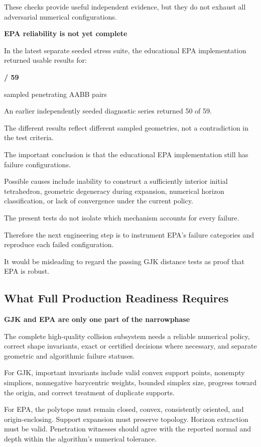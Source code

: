 These checks provide useful independent evidence, but they do not exhaust all adversarial numerical configurations.

\textbf{EPA reliability is not yet complete}

In the latest separate seeded stress suite, the educational EPA implementation returned usable results for:

\textbf{/ 59}

sampled penetrating AABB pairs

An earlier independently seeded diagnostic series returned 50 of 59.

The different results reflect different sampled geometries, not a contradiction in the test criteria.

The important conclusion is that the educational EPA implementation still has failure configurations.

Possible causes include inability to construct a sufficiently interior initial tetrahedron, geometric degeneracy during expansion, numerical horizon classification, or lack of convergence under the current policy.

The present tests do not isolate which mechanism accounts for every failure.

Therefore the next engineering step is to instrument EPA's failure categories and reproduce each failed configuration.

It would be misleading to regard the passing GJK distance tests as proof that EPA is robust.

\subsection{What Full Production Readiness Requires}\label{04-visual-computing-ii-ch026-what-full-production-readiness-requires}

\textbf{GJK and EPA are only one part of the narrowphase}

The complete high-quality collision subsystem needs a reliable numerical policy, correct shape invariants, exact or certified decisions where necessary, and separate geometric and algorithmic failure statuses.

For GJK, important invariants include valid convex support points, nonempty simplices, nonnegative barycentric weights, bounded simplex size, progress toward the origin, and correct treatment of duplicate supports.

For EPA, the polytope must remain closed, convex, consistently oriented, and origin-enclosing. Support expansion must preserve topology. Horizon extraction must be valid. Penetration witnesses should agree with the reported normal and depth within the algorithm's numerical tolerance.

